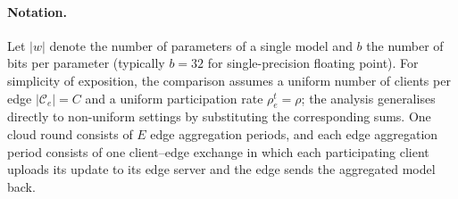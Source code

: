 \paragraph{Notation.}
Let $|w|$ denote the number of parameters of a single model and $b$ the number of bits per parameter (typically $b = 32$ for single-precision floating point). For simplicity of exposition, the comparison assumes a uniform number of clients per edge $|\mathcal{C}_e| = C$ and a uniform participation rate $\rho_e^t = \rho$; the analysis generalises directly to non-uniform settings by substituting the corresponding sums. One cloud round consists of $E$ edge aggregation periods, and each edge aggregation period consists of one client--edge exchange in which each participating client uploads its update to its edge server and the edge sends the aggregated model back.

